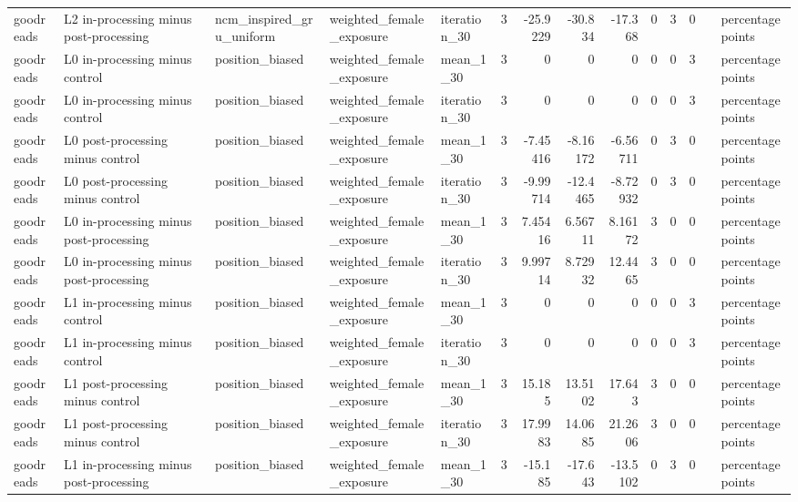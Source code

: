 \begin{table}[htbp!]
\begin{tabular}{lllllrrrrrrrll}
goodreads & L2 in-processing minus post-processing & ncm\_inspired\_gru\_uniform & weighted\_female\_exposure & iteration\_30 & 3 & -25.9229 & -30.834 & -17.368 & 0 & 3 & 0 &  & percentage points \\
goodreads & L0 in-processing minus control & position\_biased & weighted\_female\_exposure & mean\_1\_30 & 3 & 0 & 0 & 0 & 0 & 0 & 3 &  & percentage points \\
goodreads & L0 in-processing minus control & position\_biased & weighted\_female\_exposure & iteration\_30 & 3 & 0 & 0 & 0 & 0 & 0 & 3 &  & percentage points \\
goodreads & L0 post-processing minus control & position\_biased & weighted\_female\_exposure & mean\_1\_30 & 3 & -7.45416 & -8.16172 & -6.56711 & 0 & 3 & 0 &  & percentage points \\
goodreads & L0 post-processing minus control & position\_biased & weighted\_female\_exposure & iteration\_30 & 3 & -9.99714 & -12.4465 & -8.72932 & 0 & 3 & 0 &  & percentage points \\
goodreads & L0 in-processing minus post-processing & position\_biased & weighted\_female\_exposure & mean\_1\_30 & 3 & 7.45416 & 6.56711 & 8.16172 & 3 & 0 & 0 &  & percentage points \\
goodreads & L0 in-processing minus post-processing & position\_biased & weighted\_female\_exposure & iteration\_30 & 3 & 9.99714 & 8.72932 & 12.4465 & 3 & 0 & 0 &  & percentage points \\
goodreads & L1 in-processing minus control & position\_biased & weighted\_female\_exposure & mean\_1\_30 & 3 & 0 & 0 & 0 & 0 & 0 & 3 &  & percentage points \\
goodreads & L1 in-processing minus control & position\_biased & weighted\_female\_exposure & iteration\_30 & 3 & 0 & 0 & 0 & 0 & 0 & 3 &  & percentage points \\
goodreads & L1 post-processing minus control & position\_biased & weighted\_female\_exposure & mean\_1\_30 & 3 & 15.185 & 13.5102 & 17.643 & 3 & 0 & 0 &  & percentage points \\
goodreads & L1 post-processing minus control & position\_biased & weighted\_female\_exposure & iteration\_30 & 3 & 17.9983 & 14.0685 & 21.2606 & 3 & 0 & 0 &  & percentage points \\
goodreads & L1 in-processing minus post-processing & position\_biased & weighted\_female\_exposure & mean\_1\_30 & 3 & -15.185 & -17.643 & -13.5102 & 0 & 3 & 0 &  & percentage points \\

\end{tabular}
\end{table}
